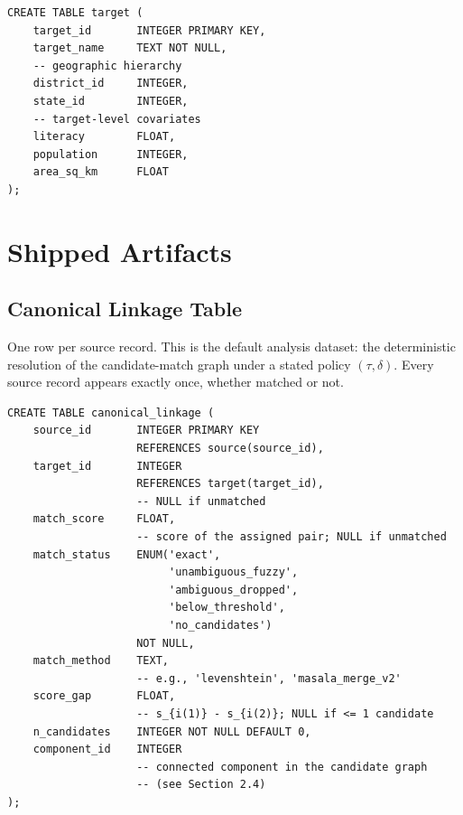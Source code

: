 \documentclass[12pt]{article}
\begin{document}
\begin{lstlisting}[style=sql]
CREATE TABLE target (
    target_id       INTEGER PRIMARY KEY,
    target_name     TEXT NOT NULL,
    -- geographic hierarchy
    district_id     INTEGER,
    state_id        INTEGER,
    -- target-level covariates
    literacy        FLOAT,
    population      INTEGER,
    area_sq_km      FLOAT
);
\end{lstlisting}

\section{Shipped Artifacts}

\subsection{Canonical Linkage Table}

One row per source record. This is the default analysis dataset: the deterministic resolution of the candidate-match graph under a stated policy $(\tau, \delta)$. Every source record appears exactly once, whether matched or not.

\begin{lstlisting}[style=sql]
CREATE TABLE canonical_linkage (
    source_id       INTEGER PRIMARY KEY
                    REFERENCES source(source_id),
    target_id       INTEGER
                    REFERENCES target(target_id),
                    -- NULL if unmatched
    match_score     FLOAT,
                    -- score of the assigned pair; NULL if unmatched
    match_status    ENUM('exact',
                         'unambiguous_fuzzy',
                         'ambiguous_dropped',
                         'below_threshold',
                         'no_candidates')
                    NOT NULL,
    match_method    TEXT,
                    -- e.g., 'levenshtein', 'masala_merge_v2'
    score_gap       FLOAT,
                    -- s_{i(1)} - s_{i(2)}; NULL if <= 1 candidate
    n_candidates    INTEGER NOT NULL DEFAULT 0,
    component_id    INTEGER
                    -- connected component in the candidate graph
                    -- (see Section 2.4)
);
\end{lstlisting}
\end{document}

